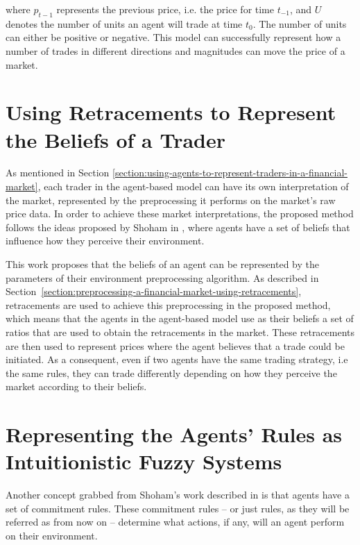 where $p_{t-1}$ represents the previous price, i.e. the price for time $t_{-1}$, and
$U$ denotes the number of units an agent will trade at time $t_0$. The number of
units can either be positive or negative. This model can successfully represent
how a number of trades in different directions and magnitudes can move the price
of a market.

\section{Using Retracements to Represent the Beliefs of a Trader}
\label{section:using-retracements-to-represent-the-beliefs-of-a-trader}

As mentioned in Section
\ref{section:using-agents-to-represent-traders-in-a-financial-market}, each
trader in the agent-based model can have its own interpretation of the market,
represented by the preprocessing it performs on the market's raw price data. In
order to achieve these market interpretations, the proposed method follows the
ideas proposed by Shoham in \cite{Shoham1993}, where agents have a set of
beliefs that influence how they perceive their environment.

This work proposes that the beliefs of an agent can be represented by the
parameters of their environment preprocessing algorithm. As described in 
Section~\ref{section:preprocessing-a-financial-market-using-retracements}, 
retracements
are used to achieve this preprocessing in the proposed method, which means that
the agents in the agent-based model use as their beliefs a set of ratios that
are used to obtain the retracements in the market. These retracements are then
used to represent prices where the agent believes that a trade could be
initiated. As a consequent, even if two agents have the same trading strategy,
i.e the same rules, they can trade differently depending on how they perceive
the market according to their beliefs.

\section{Representing the Agents' Rules as Intuitionistic Fuzzy Systems}
\label{section:representing-the-agents-rules-as-intuitionistic-fuzzy-systems}

Another concept grabbed from Shoham's work described in \cite{Shoham1993} is
that agents have a set of commitment rules. These commitment rules -- or just
rules, as they will be referred as from now on -- determine what actions, if
any, will an agent perform on their environment.

